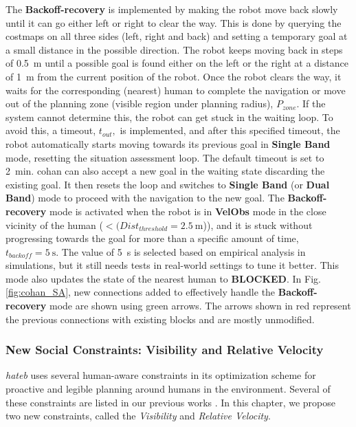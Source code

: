 The \textbf{Backoff-recovery} is implemented by making the robot move back slowly until it can go either left or right to clear the way. This is done by querying the costmaps on all three sides (left, right and back) and setting a temporary goal at a small distance in the possible direction. The robot keeps moving back in steps of \SI{0.5}{\metre} until a possible goal is found either on the left or the right at a distance of \SI{1}{\metre} from the current position of the robot. Once the robot clears the way, it waits for the corresponding (nearest) human to complete the navigation or move out of the planning zone (visible region under planning radius), $P_{zone}$. If the system cannot determine this, the robot can get stuck in the waiting loop. To avoid this, a timeout, $t_{out}, $ is implemented, and after this specified timeout, the robot automatically starts moving towards its previous goal in \textbf{Single Band} mode, resetting the situation assessment loop. The default timeout is set to \SI{2}{\minute}. \acrshort{cohan} can also accept a new goal in the waiting state discarding the existing goal. It then resets the loop and switches to \textbf{Single Band} (or \textbf{Dual Band}) mode to proceed with the navigation to the new goal. The \textbf{Backoff-recovery} mode is activated when the robot is in \textbf{VelObs} mode in the close vicinity of the human ($< (Dist_{threshold} = \SI{2.5}{\metre}$)), and it is stuck without progressing towards the goal for more than a specific amount of time, $t_{backoff} = \SI{5}{\second}$. The value of \SI{5}{\second} is selected based on empirical analysis in simulations, but it still needs tests in real-world settings to tune it better. This mode also updates the state of the nearest human to \textbf{BLOCKED}. In Fig. \ref{fig:cohan_SA}, new connections added to effectively handle the \textbf{Backoff-recovery} mode are shown using green arrows. The arrows shown in red represent the previous connections with existing blocks and are mostly unmodified.

\subsubsection{New Social Constraints: Visibility and Relative Velocity}
\textit{\acrshort{hateb}} uses several human-aware constraints in its optimization scheme for proactive and legible planning around humans in the environment. Several of these constraints are listed in our previous works \cite{khambhaita2017viewing, singamaneni2020hateb}. In this chapter, we propose two new constraints, called the \textit{Visibility} and \textit{Relative Velocity}.

